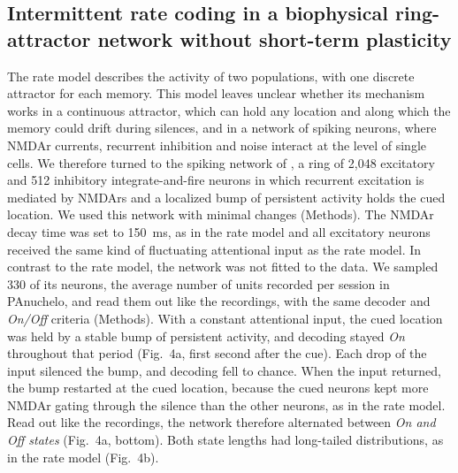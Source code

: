 \documentclass[11pt]{article}
\begin{document}
\subsection{Intermittent rate coding in a biophysical ring-attractor network without short-term plasticity}

The rate model describes the activity of two populations, with one discrete attractor for each memory. This model leaves unclear whether its mechanism works in a continuous attractor, which can hold any location and along which the memory could drift during silences, and in a network of spiking neurons, where NMDAr currents, recurrent inhibition and noise interact at the level of single cells. We therefore turned to the spiking network of \citet{compte2000}, a ring of 2,048 excitatory and 512 inhibitory integrate-and-fire neurons in which recurrent excitation is mediated by NMDArs and a localized bump of persistent activity holds the cued location. We used this network with minimal changes (Methods). The NMDAr decay time was set to 150~ms, as in the rate model and all excitatory neurons received the same kind of fluctuating attentional input as the rate model. In contrast to the rate model, the network was not fitted to the data. We sampled 330 of its neurons, the average number of units recorded per session in PAnuchelo, and read them out like the recordings, with the same decoder and \emph{On/Off} criteria (Methods). With a constant attentional input, the cued location was held by a stable bump of persistent activity, and decoding stayed \emph{On} throughout that period (Fig.~4a, first second after the cue). Each drop of the input silenced the bump, and decoding fell to chance. When the input returned, the bump restarted at the cued location, because the cued neurons kept more NMDAr gating through the silence than the other neurons, as in the rate model. Read out like the recordings, the network therefore alternated between \emph{On and Off states} (Fig.~4a, bottom). Both state lengths had long-tailed distributions, as in the rate model (Fig.~4b).
\end{document}
